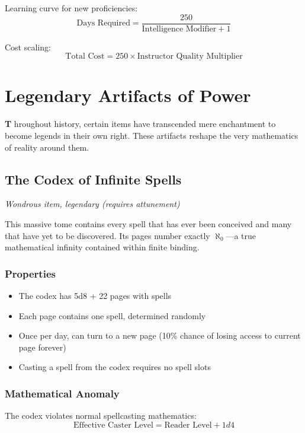 \documentclass[11pt,letterpaper,openany]{book}
\newcommand{\firstletter}[1]{%
    \textcolor{bloodred}{\fontsize{48}{48}\selectfont\bfseries #1}%
}
\begin{document}
Learning curve for new proficiencies:
\begin{equation}
\text{Days Required} = \frac{250}{\text{Intelligence Modifier} + 1}
\end{equation}

Cost scaling:
\begin{equation}
\text{Total Cost} = 250 \times \text{Instructor Quality Multiplier}
\end{equation}

\chapter{Legendary Artifacts of Power}

\firstletter{T}hroughout history, certain items have transcended mere enchantment to become legends in their own right. These artifacts reshape the very mathematics of reality around them.

\section{The Codex of Infinite Spells}

\textit{Wondrous item, legendary (requires attunement)}

This massive tome contains every spell that has ever been conceived and many that have yet to be discovered. Its pages number exactly $\aleph_0$—a true mathematical infinity contained within finite binding.

\subsection{Properties}
\begin{itemize}
    \item The codex has 5d8 + 22 pages with spells
    \item Each page contains one spell, determined randomly
    \item Once per day, can turn to a new page (10\% chance of losing access to current page forever)
    \item Casting a spell from the codex requires no spell slots
\end{itemize}

\subsection{Mathematical Anomaly}
The codex violates normal spellcasting mathematics:
\begin{equation}
\text{Effective Caster Level} = \text{Reader Level} + 1d4
\end{equation}
\end{document}
